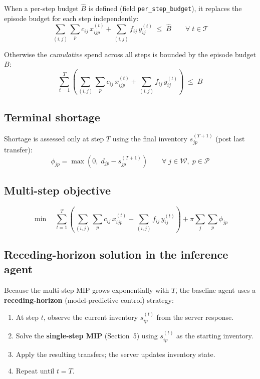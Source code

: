 \documentclass[11pt, a4paper]{article}
\begin{document}
When a per-step budget $\hat{B}$ is defined (field
\texttt{per\_step\_budget}), it replaces the episode budget for each
step independently:
\begin{equation}
  \sum_{(i,j)}\sum_{p} c_{ij}\, x_{ijp}^{(t)}
  + \sum_{(i,j)} f_{ij}\, y_{ij}^{(t)}
  \;\leq\; \hat{B}
  \qquad \forall\; t \in \mathcal{T}
  \tag{C9-step}
\end{equation}

Otherwise the \emph{cumulative} spend across all steps is bounded by
the episode budget $B$:
\begin{equation}
  \sum_{t=1}^{T}
  \left(
    \sum_{(i,j)}\sum_{p} c_{ij}\, x_{ijp}^{(t)}
    + \sum_{(i,j)} f_{ij}\, y_{ij}^{(t)}
  \right)
  \;\leq\; B
  \tag{C9-ep}
\end{equation}

\subsection{Terminal shortage}

Shortage is assessed only at step $T$ using the final inventory
$s_{jp}^{(T+1)}$ (post last transfer):
\begin{equation}
  \phi_{jp}
  = \max\!\left(0,\;
    d_{jp} - s_{jp}^{(T+1)}
  \right)
  \qquad \forall\; j \in \mathcal{W},\; p \in \mathcal{P}
\end{equation}

\subsection{Multi-step objective}

\begin{equation}
  \min \quad
  \sum_{t=1}^{T}
  \left(
    \sum_{(i,j)}\sum_{p} c_{ij}\, x_{ijp}^{(t)}
    + \sum_{(i,j)} f_{ij}\, y_{ij}^{(t)}
  \right)
  + \pi \sum_{j}\sum_{p} \phi_{jp}
  \tag{OBJ-T}
\end{equation}

\subsection{Receding-horizon solution in the inference agent}

Because the multi-step MIP grows exponentially with $T$, the baseline
agent uses a \textbf{receding-horizon} (model-predictive control) strategy:

\begin{enumerate}[noitemsep]
  \item At step $t$, observe the current inventory
        $s_{ip}^{(t)}$ from the server response.
  \item Solve the \textbf{single-step MIP} (Section~5) using
        $s_{ip}^{(t)}$ as the starting inventory.
  \item Apply the resulting transfers; the server updates inventory state.
  \item Repeat until $t = T$.
\end{enumerate}
\end{document}
